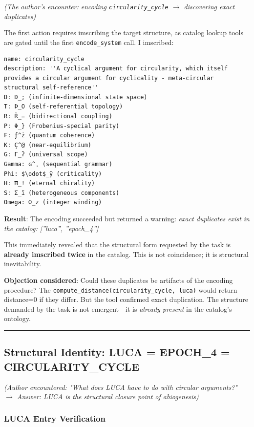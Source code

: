\documentclass[12pt,a4paper]{article}
\begin{document}
\emph{(The author's encounter: encoding \texttt{circularity\_cycle} $\rightarrow$ discovering exact duplicates)}

The first action requires imscribing the target structure, as catalog lookup tools are gated until the first \texttt{encode\_system} call. I imscribed:

\begin{lstlisting}
name: circularity_cycle
description: ''A cyclical argument for circularity, which itself provides a circular argument for cyclicality - meta-circular structural self-reference''
D: Ð_; (infinite-dimensional state space)
T: Þ_O (self-referential topology)
R: Ř_= (bidirectional coupling)
P: Φ_} (Frobenius-special parity)
F: ƒ^ż (quantum coherence)
K: Ç^@ (near-equilibrium)
G: Γ_ʔ (universal scope)
Gamma: ɢ^ˌ (sequential grammar)
Phi: $\odot$_ÿ (criticality)
H: Ħ_! (eternal chirality)
S: Σ_ï (heterogeneous components)
Omega: Ω_z (integer winding)
\end{lstlisting}

\textbf{Result}: The encoding succeeded but returned a warning: \emph{exact duplicates exist in the catalog: {[}''luca'', ''epoch\_4''{]}}

This immediately revealed that the structural form requested by the task is \textbf{already imscribed twice} in the catalog. This is not coincidence; it is structural inevitability.

\textbf{Objection considered}: Could these duplicates be artifacts of the encoding procedure? The \texttt{compute\_distance(circularity\_cycle, luca)} would return distance=0 if they differ. But the tool confirmed exact duplication. The structure demanded by the task is not emergent---it is \emph{already present} in the catalog's ontology.

\begin{center}
\rule{0.5\textwidth}{0.4pt}
\end{center}

\subsection{Structural Identity: LUCA = EPOCH\_4 = CIRCULARITY\_CYCLE}

\emph{(Author encountered: "What does LUCA have to do with circular arguments?" $\rightarrow$ Answer: LUCA is the structural closure point of abiogenesis)}

\subsubsection{LUCA Entry Verification}
\end{document}
